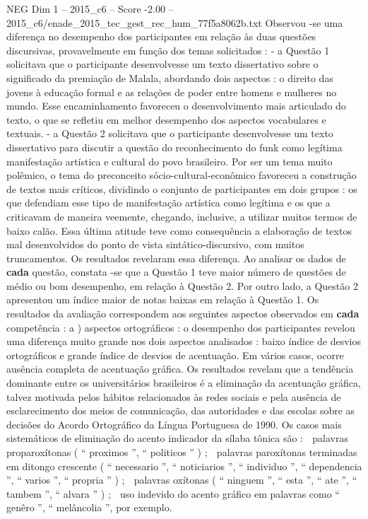 \begin{textsample}{NEG Dim 1 – 2015\_c6 – Score -2.00 – 2015\_c6/enade\_2015\_tec\_gest\_rec\_hum\_77f5a8062b.txt}
Observou -se uma diferença no desempenho dos participantes em relação às duas questões discursivas, provavelmente em função dos temas solicitados : - a Questão 1 solicitava que o participante desenvolvesse um texto dissertativo sobre o significado da premiação de Malala, abordando dois aspectos : o direito das jovens à educação formal e as relações de poder entre homens e mulheres no mundo.
Esse encaminhamento favoreceu o desenvolvimento mais articulado do texto, o que se refletiu em melhor desempenho dos aspectos vocabulares e textuais. - a Questão 2 solicitava que o participante desenvolvesse um texto dissertativo para discutir a questão do reconhecimento do funk como legítima manifestação artística e cultural do povo brasileiro.
Por ser um tema muito polêmico, o tema do preconceito sócio-cultural-econômico favoreceu a construção de textos mais críticos, dividindo o conjunto de participantes em dois grupos : os que defendiam esse tipo de manifestação artística como legítima e os que a criticavam de maneira veemente, chegando, inclusive, a utilizar muitos termos de baixo calão.
Essa última atitude teve como consequência a elaboração de textos mal desenvolvidos do ponto de vista sintático-discursivo, com muitos truncamentos.
Os resultados revelaram essa diferença.
Ao analisar os dados de \textbf{cada} questão, constata -se que a Questão 1 teve maior número de questões de médio ou bom desempenho, em relação à Questão 2.
Por outro lado, a Questão 2 apresentou um índice maior de notas baixas em relação à Questão 1.
Os resultados da avaliação correspondem aos seguintes aspectos observados em \textbf{cada} competência : a ) aspectos ortográficos : o desempenho dos participantes revelou uma diferença muito grande nos dois aspectos analisados : baixo índice de desvios ortográficos e grande índice de desvios de acentuação.
Em vários casos, ocorre ausência completa de acentuação gráfica.
Os resultados revelam que a tendência dominante entre os universitários brasileiros é a eliminação da acentuação gráfica, talvez motivada pelos hábitos relacionados às redes sociais e pela ausência de esclarecimento dos meios de comunicação, das autoridades e das escolas sobre as decisões do Acordo Ortográfico da Língua Portuguesa de 1990.
Os casos mais sistemáticos de eliminação do acento indicador da sílaba tônica são :  palavras proparoxítonas ( “ proximos ”, “ politicos ” ) ;  palavras paroxítonas terminadas em ditongo crescente ( “ necessario ”, “ noticiarios ”, “ individuo ”, “ dependencia ”, “ varios ”, “ propria ” ) ;  palavras oxítonas ( “ ninguem ”, “ esta ”, “ ate ”, “ tambem ”, “ alvara ” ) ;  uso indevido do acento gráfico em palavras como “ genêro ”, “ melâncolia ”, por exemplo.

\end{textsample}

